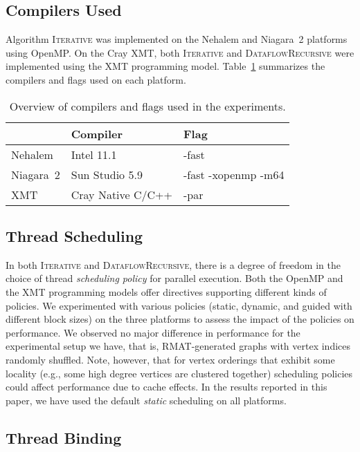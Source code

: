 \documentclass{article}
\begin{document}
\subsection{Compilers Used}
\label{sec:compilers}
Algorithm \textsc{Iterative} was implemented on the Nehalem and Niagara~2  platforms using OpenMP.
On the Cray XMT, both  \textsc{Iterative} and \textsc{DataflowRecursive} were 
implemented using the XMT programming model.
Table~\ref{t:compilers} summarizes the compilers and flags used on each platform.
\begin{table}
\begin{footnotesize}
\centering
\begin{tabular}{l|ll}
& Compiler & Flag \\ \hline
Nehalem & Intel 11.1 & -fast \\
Niagara~2 & Sun Studio 5.9 & -fast -xopenmp -m64 \\
XMT & Cray Native C/C++  & -par  
\end{tabular}
\caption{Overview of compilers and flags used in the experiments.}
\label{t:compilers}
\end{footnotesize}
\end{table}

\subsection{Thread Scheduling}
\label{sec:scheduling}

In both \textsc{Iterative} and \textsc{DataflowRecursive}, 
there is a degree of freedom in the choice
of thread {\em scheduling policy} for parallel execution.  
Both the OpenMP and the XMT programming models offer directives 
supporting different kinds of policies.
We experimented with  various policies (static,
dynamic, and guided with different block sizes)
on the three platforms to assess the impact of the policies on performance. 
We observed no major difference in performance for the experimental setup 
we have, that is, RMAT-generated graphs with vertex indices randomly shuffled.
Note, however, that for vertex orderings that exhibit
some locality (e.g., some high degree vertices are clustered together) 
scheduling policies could
affect performance due to  cache effects.
In the results reported in this paper, we have used the default {\em static} 
scheduling on all platforms.

\subsection{Thread Binding}
\label{sec:binding}
\end{document}
